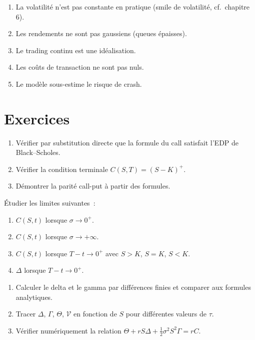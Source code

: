 \begin{attention}[title=\textbf{Limites connues du mod\`ele de Black--Scholes}]
\begin{enumerate}
    \item La volatilit\'e n'est pas constante en pratique
          (smile de volatilit\'e, cf.\ chapitre 6).
    \item Les rendements ne sont pas gaussiens (queues \'epaisses).
    \item Le trading continu est une id\'ealisation.
    \item Les co\^uts de transaction ne sont pas nuls.
    \item Le mod\`ele sous-estime le risque de crash.
\end{enumerate}
\end{attention}

\section{Exercices}

\begin{exercice}
\begin{enumerate}
    \item V\'erifier par substitution directe que la formule du call
          satisfait l'EDP de Black--Scholes.
    \item V\'erifier la condition terminale $C(S,T) = (S-K)^+$.
    \item D\'emontrer la parit\'e call-put \`a partir des formules.
\end{enumerate}
\end{exercice}

\begin{exercice}
\'Etudier les limites suivantes~:
\begin{enumerate}
    \item $C(S,t)$ lorsque $\sigma \to 0^+$.
    \item $C(S,t)$ lorsque $\sigma \to +\infty$.
    \item $C(S,t)$ lorsque $T - t \to 0^+$ avec $S > K$, $S = K$, $S < K$.
    \item $\Delta$ lorsque $T - t \to 0^+$.
\end{enumerate}
\end{exercice}

\begin{exercice}
\begin{enumerate}
    \item Calculer le delta et le gamma par diff\'erences finies et comparer
          aux formules analytiques.
    \item Tracer $\Delta$, $\Gamma$, $\Theta$, $\mathcal{V}$ en fonction
          de $S$ pour diff\'erentes valeurs de $\tau$.
    \item V\'erifier num\'eriquement la relation $\Theta + rS\Delta +
          \frac{1}{2}\sigma^2 S^2\Gamma = rC$.
\end{enumerate}
\end{exercice}

